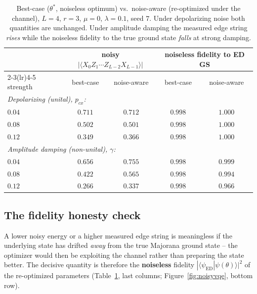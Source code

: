 \documentclass[11pt]{article}
\newcommand{\Oedge}{X_0 Z_1\cdots Z_{L-2} X_{L-1}}
\newcommand{\expv}[1]{\langle #1\rangle}
\begin{document}
\begin{table}[t]
  \centering
  \footnotesize
  \begin{tabular}{lcccc}
    \toprule
    & \multicolumn{2}{c}{noisy $|\expv{\Oedge}|$} & \multicolumn{2}{c}{noiseless fidelity to ED GS}\\
    \cmidrule(lr){2-3}\cmidrule(lr){4-5}
    strength & best-case & noise-aware & best-case & noise-aware\\
    \midrule
    \multicolumn{5}{l}{\emph{Depolarizing (unital), $p_{cx}$:}}\\
    $0.04$ & $0.711$ & $0.712$ & $0.998$ & $1.000$\\
    $0.08$ & $0.502$ & $0.501$ & $0.998$ & $1.000$\\
    $0.12$ & $0.349$ & $0.366$ & $0.998$ & $1.000$\\
    \midrule
    \multicolumn{5}{l}{\emph{Amplitude damping (non-unital), $\gamma$:}}\\
    $0.04$ & $0.656$ & $\mathbf{0.755}$ & $0.998$ & $0.999$\\
    $0.08$ & $0.422$ & $\mathbf{0.565}$ & $0.998$ & $0.994$\\
    $0.12$ & $0.266$ & $\mathbf{0.337}$ & $0.998$ & $\mathbf{0.966}$\\
    \bottomrule
  \end{tabular}
  \caption{Best-case ($\theta^\ast$, noiseless optimum) vs.\ noise-aware (re-optimized
  under the channel), $L=4$, $r=3$, $\mu=0$, $\lambda=0.1$, seed $7$. Under
  depolarizing noise both quantities are unchanged. Under amplitude damping the
  measured edge string \emph{rises} while the noiseless fidelity to the true ground
  state \emph{falls} at strong damping.}
  \label{tab:noisy}
\end{table}

\subsection{The fidelity honesty check}

A lower noisy energy or a higher measured edge string is meaningless if the
underlying state has drifted \emph{away} from the true Majorana ground state -- the
optimizer would then be exploiting the channel rather than preparing the state
better. The decisive quantity is therefore the \textbf{noiseless} fidelity
$|\langle\psi_{\text{ED}}|\psi(\theta)\rangle|^2$ of the re-optimized parameters
(Table~\ref{tab:noisy}, last columns; Figure~\ref{fig:noisyvqe}, bottom row).
\end{document}
